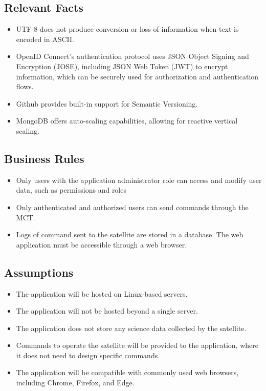 \documentclass[12pt]{article}
\begin{document}
\subsection{Relevant Facts}
\begin{itemize}
    \item UTF-8 does not produce conversion or loss of information when text is encoded in ASCII.
    \item OpenID Connect’s authentication protocol uses JSON Object Signing and Encryption (JOSE), including JSON Web Token (JWT) to encrypt information, which can be securely used for authorization and authentication flows.
    \item Github provides built-in support for Semantic Versioning.
    \item MongoDB offers auto-scaling capabilities, allowing for reactive vertical scaling.
    
\end{itemize}
\subsection{Business Rules}
\begin{itemize}
    \item Only users with the application administrator role can access and modify user data, such as permissions and roles
    \item Only authenticated and authorized users can send commands through the MCT.
    \item Logs of command sent to the satellite are stored in a database.
    The web application must be accessible through a web browser.
\end{itemize}

\subsection{Assumptions}
\begin{itemize}
    \item The application will be hosted on Linux-based servers.
    \item The application will not be hosted beyond a single server.
    \item The application does not store any science data collected by the satellite.
    \item Commands to operate the satellite will be provided to the application, where it does not need to design specific commands.
    \item The application will be compatible with commonly used web browsers, including Chrome, Firefox, and Edge.
\end{itemize}
\end{document}
